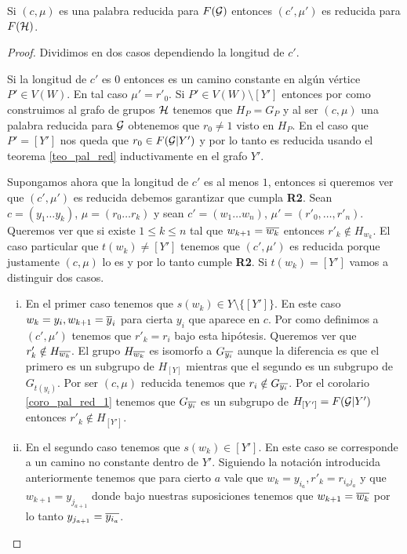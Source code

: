 \documentclass[tesis.tex]{subfiles}
\begin{document}
\begin{prop}\label{lema_pal_red_iso}
	Si $(c, \mu)$ es una palabra reducida para $F({\cal G})$ entonces $(c', \mu')$ es reducida para $F({\cal H})$.
\end{prop}
\begin{proof}
	Dividimos en dos casos dependiendo la longitud de $c'$.
	
	Si la longitud de $c'$ es  $0$ entonces es un camino constante en algún vértice $P' \in V(W)$. 
	En tal caso $\mu' = r'_0$.
	Si $P' \in V(W) \setminus [Y']$ entonces por como construimos al grafo de grupos $\cal H$ tenemos que $H_P = G_P$ y al ser $(c, \mu)$ una palabra reducida para ${\cal G}$ obtenemos que $r_0 \neq 1$ visto en $H_P$.
	En el caso que $P' = [Y']$ nos queda que $r_0 \in F({\cal G} | Y')$ y por lo tanto es reducida usando el teorema \ref{teo_pal_red} inductivamente en el grafo $Y'$.
	
	Supongamos ahora que la longitud de $c'$ es al menos $1$, entonces si queremos ver que  $(c',\mu')$ es reducida debemos garantizar que cumpla \textbf{R2}.
	Sean $c = (y_{1} \dots y_{k})$, $\mu = (r_{0} \dots r_{k})$ y sean
	$c' = (w_1 \dots w_{n})$, $\mu' = (r'_0, \dots, r'_n)$.
	Queremos ver que si existe $1 \le k \le n$ tal que  $w_{k+1} = \overline{w_k}$ entonces $r'_k \notin H_{w_k}$.		
	El caso particular que $t(w_k) \neq [Y']$ tenemos que $(c', \mu')$ es reducida porque justamente $(c, \mu)$ lo es y por lo tanto cumple \textbf{R2}.
	Si $t(w_k) = [Y']$ vamos a distinguir dos casos.
	
	\begin{enumerate}[i)]
		\item En el primer caso tenemos que $s(w_{k}) \in Y \setminus \{[Y']\}$.
		En este caso $w_{k} = y_i, w_{k+1} = \overline y_i$ para cierta $y_i$ que aparece en $c$.
		Por como definimos a $(c', \mu')$ tenemos que $r'_k = r_i$ bajo esta hipótesis.
		Queremos ver que $r'_k \notin H_{\overline{w_k}}$.
		El grupo $H_{\overline{w_k}}$ es isomorfo a $G_{\overline{y_i}}$ aunque la diferencia es que el primero es un subgrupo de $H_{[Y]}$ mientras que el segundo es un subgrupo de $G_{t(y_i)}$.
		Por ser $(c, \mu)$ reducida tenemos que $r_i \notin G_{\overline{y_i}}$.
		Por el corolario \ref{coro_pal_red_1} tenemos que $G_{\overline{y_i}}$ es un subgrupo de $H_{[Y']} = F({\cal G} | Y')$ entonces $r'_k \notin H_{[Y']}$.
		
		\item En el segundo caso tenemos que $s(w_{k}) \in [Y']$. 
		En este caso se corresponde a un camino no constante dentro de $Y'$.
		Siguiendo la notación introducida anteriormente tenemos que para cierto $a$ vale que $w_k = y_{i_a}, r'_k = r_{i_aj_a}$ y que $w_{k+1} = y_{j_{a+1}}$ donde bajo nuestras suposiciones tenemos que $w_{k+1} = \overline{w_{k}}$ por lo tanto $ y_{j_{a+1}} = \overline{y_{i_a}}$.
		

\end{enumerate}
\end{proof}
\end{document}
